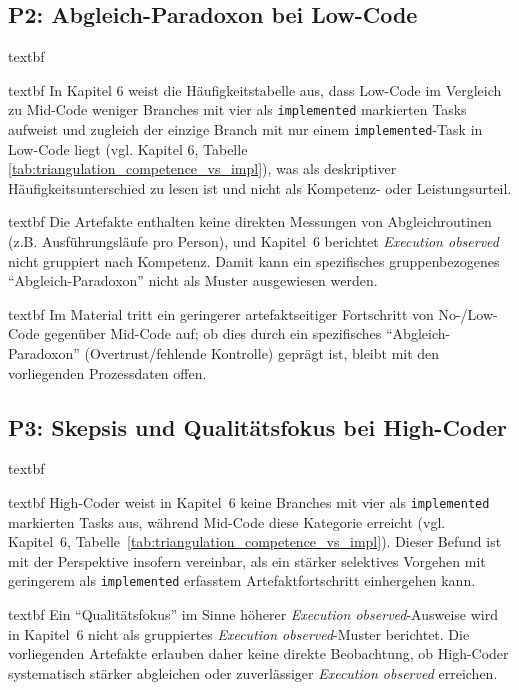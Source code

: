\subsection{P2: Abgleich-Paradoxon bei Low-Code}
\label{sec:discussion_p2}

	\csname textbf

	\csname textbf In Kapitel 6 weist die H\"aufigkeitstabelle aus, dass Low-Code im Vergleich zu Mid-Code weniger Branches mit vier als \texttt{implemented} markierten Tasks aufweist und zugleich der einzige Branch mit nur einem \texttt{implemented}-Task in Low-Code liegt (vgl. Kapitel 6, Tabelle \ref{tab:triangulation_competence_vs_impl}), was als deskriptiver H\"aufigkeitsunterschied zu lesen ist und nicht als Kompetenz- oder Leistungsurteil.

	\csname textbf Die Artefakte enthalten keine direkten Messungen von Abgleichroutinen (z.B. Ausf\"uhrungsl\"aufe pro Person), und Kapitel~6 berichtet \textit{Execution observed} nicht gruppiert nach Kompetenz. Damit kann ein spezifisches gruppenbezogenes \enquote{Abgleich-Paradoxon} nicht als Muster ausgewiesen werden.

	\csname textbf Im Material tritt ein geringerer artefaktseitiger Fortschritt von No-/Low-Code gegen\"uber Mid-Code auf; ob dies durch ein spezifisches \enquote{Abgleich-Paradoxon} (Overtrust/fehlende Kontrolle) gepr\"agt ist, bleibt mit den vorliegenden Prozessdaten offen.

\subsection{P3: Skepsis und Qualit\"atsfokus bei High-Coder}
\label{sec:discussion_p3}

	\csname textbf

	\csname textbf High-Coder weist in Kapitel~6 keine Branches mit vier als \texttt{implemented} markierten Tasks aus, w\"ahrend Mid-Code diese Kategorie erreicht (vgl. Kapitel~6, Tabelle~\ref{tab:triangulation_competence_vs_impl}). Dieser Befund ist mit der Perspektive insofern vereinbar, als ein st\"arker selektives Vorgehen mit geringerem als \texttt{implemented} erfasstem Artefaktfortschritt einhergehen kann.

	\csname textbf Ein \enquote{Qualit\"atsfokus} im Sinne h\"oherer \textit{Execution observed}-Ausweise wird in Kapitel~6 nicht als gruppiertes \textit{Execution observed}-Muster berichtet. Die vorliegenden Artefakte erlauben daher keine direkte Beobachtung, ob High-Coder systematisch st\"arker abgleichen oder zuverl\"assiger \textit{Execution observed} erreichen.

